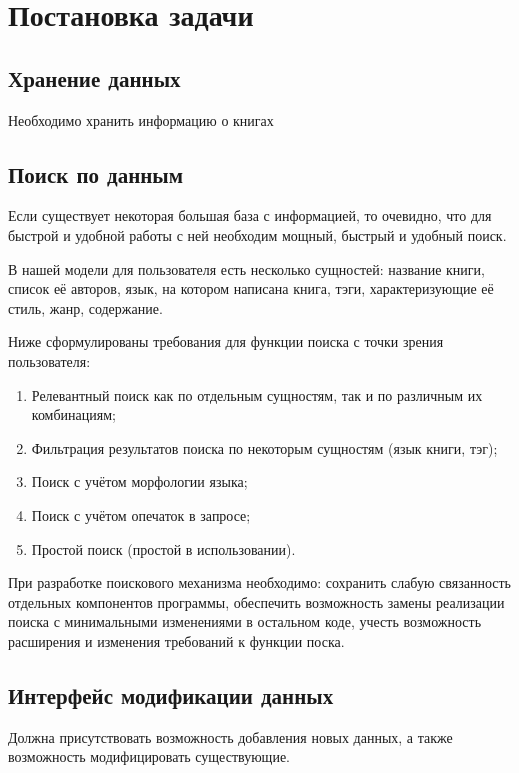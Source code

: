 
\section{Постановка задачи}

\subsection{Хранение данных}

Необходимо хранить информацию о книгах

\subsection{Поиск по данным}

Если существует некоторая большая база с информацией, то очевидно, 
что для быстрой и удобной работы с ней необходим мощный, быстрый и удобный поиск.

В нашей модели для пользователя есть несколько сущностей: название книги, 
список её авторов, язык, на котором написана книга, тэги, характеризующие её стиль, жанр, содержание.

Ниже сформулированы требования для функции поиска с точки зрения пользователя:
\begin{enumerate}
  \item  Релевантный поиск как по отдельным сущностям, так и по различным их комбинациям;
  \item  Фильтрация результатов поиска по некоторым сущностям (язык книги, тэг);
  \item  Поиск с учётом морфологии языка;
  \item  Поиск с учётом опечаток в запросе;
  \item  Простой поиск (простой в использовании).
\end{enumerate}

При разработке поискового механизма необходимо: сохранить слабую связанность отдельных компонентов программы, обеспечить возможность замены реализации поиска с минимальными изменениями в остальном коде, учесть возможность расширения и изменения требований к функции поска.


\subsection{Интерфейс модификации данных}

Должна присутствовать возможность добавления новых данных, 
а также возможность модифицировать существующие.
